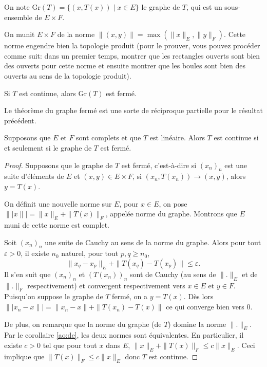 \begin{df}
  On note $\mathrm{Gr}(T) = \{(x, T(x))\mid x\in E\}$ le graphe
  de $T$, qui est un sous-ensemble de $E\times F$.
\end{df}

On munit $E\times F$ de la norme $\|(x, y)\| = \max (\|x\|_E, \|y\|_F)$.
Cette norme engendre bien la topologie produit (pour le prouver, vous
pouvez procéder comme suit: dans un premier temps, montrer que les rectangles
ouverts sont bien des ouverts pour cette norme et ensuite montrer que
les boules sont bien des ouverts au sens de la topologie produit).

\begin{exo}
  Si $T$ est continue, alors $\mathrm{Gr}(T)$ est fermé.
\end{exo}

Le théorème du graphe fermé est une sorte de réciproque partielle
pour le résultat précédent.
\begin{thm}
  Supposons que $E$ et $F$ sont complets et que $T$ est linéaire.
  Alors $T$ est continue si et seulement si le graphe de $T$ est
  fermé.
\end{thm}

\begin{proof}
  Supposons que le graphe de $T$ est fermé, c'est-à-dire si
  $(x_n)_n$ est une suite d'éléments de $E$ et
  $(x, y)\in E\times F$, si $(x_n, T(x_n))\to (x, y)$, alors
  $y = T(x)$.

  On définit une nouvelle norme sur $E$, pour $x\in E$, on
  pose $\|\!|x \|\!| = \|x\|_E + \|T(x)\|_F$, appelée norme du graphe.
  Montrons que $E$ muni de cette norme est complet.

  Soit $(x_n)_n$ une suite de Cauchy au sens de la norme du graphe.
  Alors pour tout $\varepsilon >0$, il existe $n_0$ naturel,
  pour tout $p, q\geq n_0$,
  $$\|x_q-x_p\|_E + \|T(x_q)-T(x_p)\|\leq \varepsilon.$$
  Il s'en suit que $(x_n)_n$ et $(T(x_n))_n$ sont de Cauchy (au
  sens de $\|.\|_E$ et de $ \|.\|_F$ respectivement) et convergent
  respectivement vers $x\in E$ et $y\in F$.
  Puisqu'on suppose le graphe de $T$ fermé, on a $y = T(x)$.
  Dès lors $\||x_n -x \|| = \|x_n - x\| + \|T(x_n)-T(x)\|$
  ce qui converge bien vers $0$.

  De plus, on remarque que la norme du graphe (de $T$)
  domine la norme $\|.\|_E$. Par le corollaire \ref{ao:de},
  les deux normes sont équivalentes. En particulier,
  il existe $c > 0$ tel que pour tout $x$ dans $E$,
  $\|x\|_E + \|T(x)\|_F\leq c\|x\|_E$. Ceci implique
  que $\|T(x)\|_F\leq c\|x\|_E$ donc $T$ est continue.
\end{proof}


